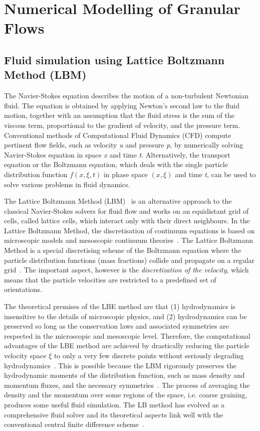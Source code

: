 \chapter{Numerical Modelling of Granular Flows}
\section{Fluid simulation using Lattice Boltzmann Method (LBM)}
The Navier-Stokes equation describes the motion of a non-turbulent Newtonian fluid. The equation is obtained by applying Newton's second law to the fluid motion, together with an assumption that the fluid stress is the sum of the viscous term, proportional to the gradient of velocity, and the pressure term. Conventional methods of Computational Fluid Dynamics (CFD) compute pertinent flow fields, such as velocity \textit{u} and pressure \textit{p}, by numerically solving Navier-Stokes equation in space \textit{x} and time \textit{t}. Alternatively, the transport equation or the Boltzmann equation, which deals with the single particle distribution function $f(x, \xi,t)$ in phase space $(x, \xi)$ and time \textit{t}, can be used to solve various problems in fluid dynamics. 

The Lattice Boltzmann Method (LBM)~\citep{Chen1998} is an alternative approach to the classical Navier-Stokes solvers for fluid flow and works on an equidistant grid of cells, called lattice cells, which interact only with their direct neighbours. In the Lattice Boltzmann Method, the discretisation of continuum equations is based on microscopic models and mesoscopic continuum theories~\citep{Chen1998}. The Lattice Boltzmann Method is a special discretising scheme of the Boltzmann equation where the particle distribution functions (mass fractions) collide and propagate on a regular grid~\citep{Zhou2012}. The important aspect, however is the \textit{discretization of the velocity}, which means that the particle velocities are restricted to a predefined set of orientations.

The theoretical premises of the LBE method are that (1) hydrodynamics is insensitive to the details of microscopic physics, and (2) hydrodynamics can be preserved so long as the conservation laws and associated symmetries are respected in the microscopic and mesoscopic level. Therefore, the computational advantages of the LBE method are achieved by drastically reducing the particle velocity space $\xi$ to only a very few discrete points without seriously degrading hydrodynamics~\citep{Mei2000}. This is possible because the LBM rigorously preserves the hydrodynamic moments of the distribution function, such as mass density and momentum fluxes, and the necessary symmetries~\citep{He1997a,He1997b}. The process of averaging the density and the momentum over some regions of the space, i.e. coarse graining, produces some useful fluid simulation. The LB method has evolved as a comprehensive fluid solver and its theoretical aspects link well with the conventional central finite difference scheme~\citep{cook2004}.


